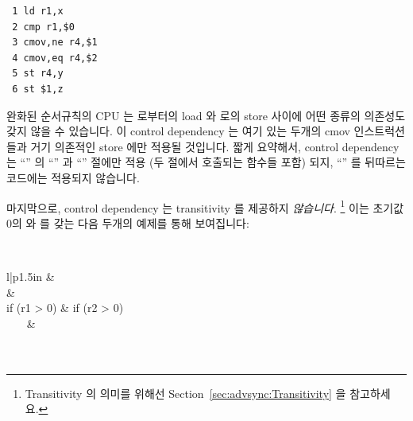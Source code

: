 \begin{enumerate}
\vspace{5pt}
\begin{minipage}[t]{\columnwidth}
\scriptsize
\begin{verbatim}
 1 ld r1,x
 2 cmp r1,$0
 3 cmov,ne r4,$1
 4 cmov,eq r4,$2
 5 st r4,y
 6 st $1,z
\end{verbatim}
\end{minipage}
\vspace{5pt}

완화된 순서규칙의 CPU 는  로부터의 load 와  로의 store 사이에 어떤
종류의 의존성도 갖지 않을 수 있습니다.
이 control dependency 는 여기 있는 두개의 cmov 인스트럭션들과 거기 의존적인
store 에만 적용될 것입니다.
짧게 요약해서, control dependency 는 ``'' 의 ``'' 과
``'' 절에만 적용 (두 절에서 호출되는 함수들 포함) 되지, ``'' 를
뒤따르는 코드에는 적용되지 않습니다.

마지막으로, control dependency 는 transitivity 를 제공하지 \emph{않습니다}.
\footnote{
	Transitivity 의 의미를 위해선
	Section~\ref{sec:advsync:Transitivity} 을 참고하세요.}
이는 초기값 0의  와  를 갖는 다음 두개의 예제를 통해 보여집니다:

\vspace{5pt}
\begin{minipage}[t]{\columnwidth}
\tt
\scriptsize
\begin{tabular}{l|p{1.5in}}
	 &	\nf{CPU 1} \\
	\hline
	 &
		\tco{r2 = READ_ONCE(y);} \\
	if (r1 > 0) &
		if (r2 > 0) \\
	~~~ &
		~~~\tco{WRITE_ONCE(x, 1);} \\
	 \\
	 \\
\end{tabular}
\end{minipage}
\vspace{5pt}


\end{enumerate}
